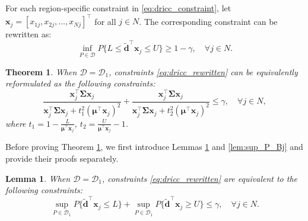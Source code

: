 \documentclass[preprint,12pt,authoryear]{elsarticle}
\newtheorem{theorem}{Theorem}
\newtheorem{lemma}{Lemma}
\begin{document}
For each region-specific constraint in \eqref{eq:dricc_constraint}, let $\mathbf{x}_j = [x_{1j}, x_{2j}, \ldots, x_{Nj}]^\top$ for all $j \in N$. The corresponding constraint can be rewritten as:
\begin{equation}
\inf_{P \in \mathcal{D}} P \{L \leqslant \widetilde{\mathbf{d}}^\top \mathbf{x}_j \leqslant U \} \geqslant 1 - \gamma, \quad \forall j \in N. \label{eq:dricc_rewritten}
\end{equation}

\begin{theorem}\label{thm:dricc_d1}
When $\mathcal{D} = \mathcal{D}_1$, constraints \eqref{eq:dricc_rewritten} can be equivalently reformulated as the following constraints:
\begin{equation}
    \frac{\mathbf{x}_j^\top \boldsymbol{\Sigma} \mathbf{x}_j}{\mathbf{x}_j^\top \boldsymbol{\Sigma} \mathbf{x}_j + t_1^2 (\boldsymbol{\mu}^\top \mathbf{x}_j)^2} + \frac{\mathbf{x}_j^\top \boldsymbol{\Sigma} \mathbf{x}_j}{\mathbf{x}_j^\top \boldsymbol{\Sigma} \mathbf{x}_j + t_2^2 (\boldsymbol{\mu}^\top \mathbf{x}_j)^2} \leqslant \gamma, \quad \forall j \in N, \label{eq:dricc_d1_reform}
\end{equation}
where $t_1 = 1 - \frac{L}{\boldsymbol{\mu}^\top \mathbf{x}_j}$, $t_2 = \frac{U}{\boldsymbol{\mu}^\top \mathbf{x}_j} - 1$.
\end{theorem}

Before proving Theorem \ref{thm:dricc_d1}, we first introduce Lemmas \ref{lem:dricc_equivalence} and \ref{lem:sup_P_Bj} and provide their proofs separately.

\begin{lemma}\label{lem:dricc_equivalence}
When $\mathcal{D} = \mathcal{D}_1$,  constraints \eqref{eq:dricc_rewritten} are equivalent to the following constraints:
\begin{equation}
\sup_{P \in \mathcal{D}_1} P \{\widetilde{\mathbf{d}}^\top \mathbf{x}_j \leqslant L\}  +  \sup_{P \in \mathcal{D}_1} P \{\widetilde{\mathbf{d}}^\top \mathbf{x}_j \geqslant U \} \leqslant \gamma, \quad \forall j \in N.
\end{equation}
\end{lemma}
\end{document}
